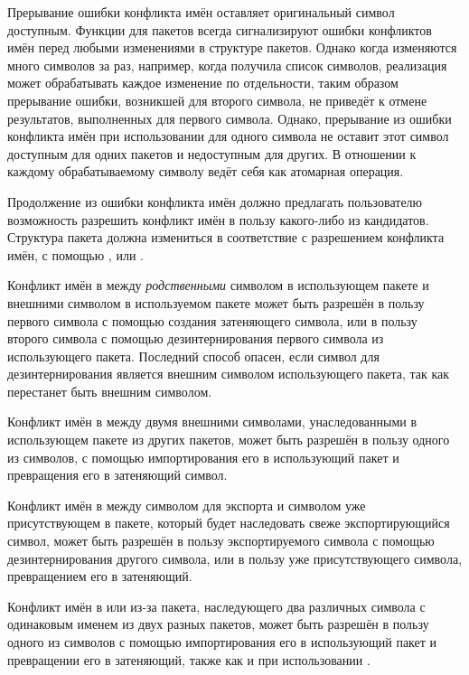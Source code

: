 Прерывание ошибки конфликта имён оставляет оригинальный символ доступным.
Функции для пакетов всегда сигнализируют ошибки конфликтов имён перед любыми
изменениями в структуре пакетов. Однако когда изменяются много символов за раз,
например, когда  получила список символов, реализация может
обрабатывать каждое изменение по отдельности, таким образом прерывание ошибки,
возникшей для второго символа, не приведёт к отмене результатов, выполненных для
первого символа. Однако, прерывание из ошибки конфликта имён при использовании
 для одного символа не оставит этот символ доступным для одних
пакетов и недоступным для других. В отношении к каждому обрабатываемому символу
 ведёт себя как атомарная операция.

Продолжение из ошибки конфликта имён должно предлагать пользователю возможность
разрешить конфликт имён в пользу какого-либо из кандидатов. Структура пакета
должна измениться в соответствие с разрешением конфликта имён, с помощью
,  или .

Конфликт имён в  между \emph{родственными} символом в
использующем пакете и внешними символом в используемом пакете может быть
разрешён в пользу первого символа с помощью создания затеняющего символа, или в
пользу второго символа с помощью дезинтернирования первого символа из
использующего пакета. Последний способ опасен, если символ для дезинтернирования
является внешним символом использующего пакета, так как перестанет быть внешним
символом.

Конфликт имён в  между двумя внешними символами,
унаследованными в использующем пакете из других пакетов, может быть разрешён в пользу одного из
символов, с помощью импортирования его в использующий пакет и превращения его в
затеняющий символ.

Конфликт имён в  между символом для экспорта и символом уже
присутствующем в пакете, который будет наследовать свеже экспортирующийся
символ, может быть разрешён в пользу экспортируемого символа с помощью
дезинтернирования другого символа, или в пользу уже присутствующего символа,
превращением его в затеняющий.

Конфликт имён в  или  из-за пакета, наследующего два
различных символа с одинаковым именем из двух разных пакетов, может быть
разрешён в пользу одного из символов с помощью импортирования его в использующий
пакет и превращении его в затеняющий, также как и при использовании
.

